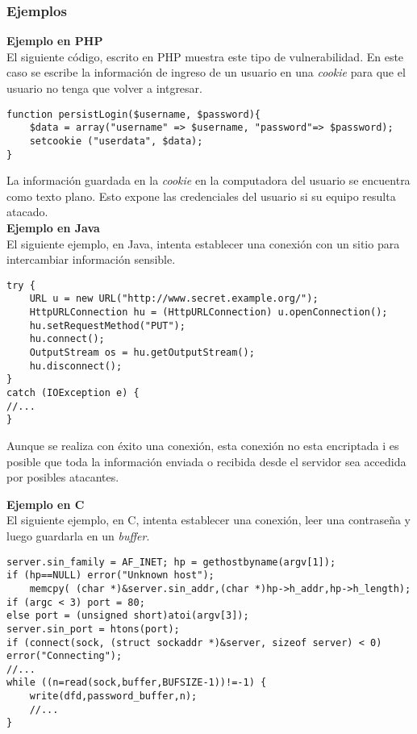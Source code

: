 \subsubsection{Ejemplos}

\noindent \textbf{Ejemplo en PHP}\\

El siguiente código, escrito en PHP muestra este tipo de vulnerabilidad.
En este caso se escribe la información de ingreso de un usuario en una \textit{cookie} para que el usuario no tenga que volver a intgresar.
\begin{lstlisting}[frame=single]
function persistLogin($username, $password){
    $data = array("username" => $username, "password"=> $password);
    setcookie ("userdata", $data);
}
\end{lstlisting}

La información guardada en la \textit{cookie} en la computadora del usuario se encuentra como texto plano.
Esto expone las credenciales del usuario si su equipo resulta atacado. \\

\noindent \textbf{Ejemplo en Java}\\

El siguiente ejemplo, en Java, intenta establecer una conexión con un sitio para intercambiar información sensible.

\begin{lstlisting}[frame=single]
try {
	URL u = new URL("http://www.secret.example.org/");
	HttpURLConnection hu = (HttpURLConnection) u.openConnection();
	hu.setRequestMethod("PUT");
	hu.connect();
	OutputStream os = hu.getOutputStream();
	hu.disconnect();
}
catch (IOException e) {
//...
}
\end{lstlisting}

Aunque se realiza con éxito una conexión, esta conexión no esta encriptada i es posible que toda la información enviada o recibida desde el servidor sea accedida por posibles atacantes.

\noindent \textbf{Ejemplo en C}\\

El siguiente ejemplo, en C, intenta establecer una conexión, leer una contraseña y luego guardarla en un \textit{buffer}.

\begin{lstlisting}[frame=single]
server.sin_family = AF_INET; hp = gethostbyname(argv[1]);
if (hp==NULL) error("Unknown host");
    memcpy( (char *)&server.sin_addr,(char *)hp->h_addr,hp->h_length);
if (argc < 3) port = 80;
else port = (unsigned short)atoi(argv[3]);
server.sin_port = htons(port);
if (connect(sock, (struct sockaddr *)&server, sizeof server) < 0) error("Connecting");
//...
while ((n=read(sock,buffer,BUFSIZE-1))!=-1) {
	write(dfd,password_buffer,n);
	//...
}
\end{lstlisting}

